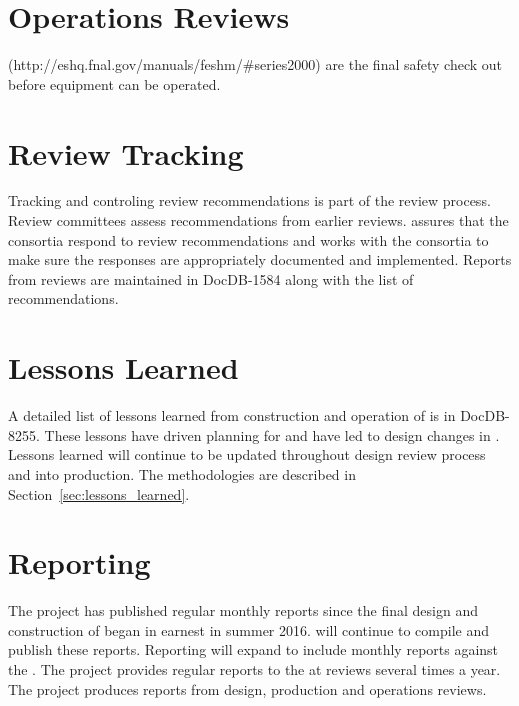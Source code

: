 \section{Operations Reviews}

 (http://eshq.fnal.gov/manuals/feshm/\#series2000) are the
final safety check out before equipment can be operated.

\section{Review Tracking}

Tracking and controling review recommendations is part of the review
process. Review committees assess recommendations from earlier
reviews.  assures that the consortia respond to review
recommendations and works with the consortia to make sure the
responses are appropriately documented and implemented. Reports from
 reviews are maintained in DocDB-1584 along with the list
of recommendations.


\section{Lessons Learned}
\label{sec:fdsp-coord-lessons}

A detailed list of lessons learned from construction and operation of
 is in DocDB-8255. These lessons have driven planning for
 and have led to design changes in . Lessons
learned will continue to be updated throughout design review process
and into production. The methodologies are described in
Section~\ref{sec:lessons_learned}.


\section{Reporting}
\label{sec:fdsp-coord-reporting}

The  project has published regular monthly reports since
the final design and construction of  began in
earnest in summer 2016.  will continue to compile and
publish these reports. Reporting will expand to include monthly
reports against the . The  project provides
regular reports to the  at reviews several times a
year. The  project produces reports from design,
production and operations reviews.
